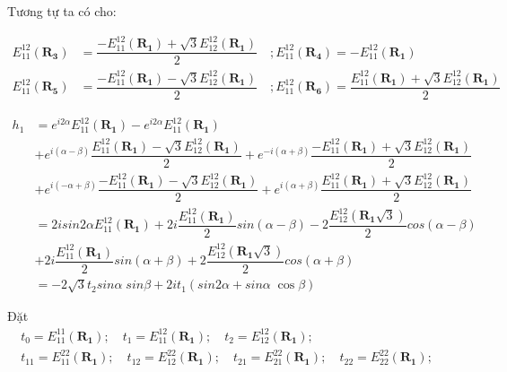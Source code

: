 \documentclass{report}
\begin{document}
Tương tự ta có cho:

\begin{align*}
	E_{11}^{12}(\mathbf{R_3}) & =  \dfrac{ -E_{11}^{12}(\mathbf{R_1}) + \sqrt{3} E_{12}^{12}(\mathbf{R_1})}{2} \quad ;  E_{11}^{12}(\mathbf{R_4}) = - E_{11}^{12}(\mathbf{R_1})                                                 \\
	E_{11}^{12}(\mathbf{R_5}) & =  \dfrac{ -E_{11}^{12}(\mathbf{R_1}) - \sqrt{3} E_{12}^{12}(\mathbf{R_1})}{2} \quad ; E_{11}^{12}(\mathbf{R_6})  =  \dfrac{ E_{11}^{12}(\mathbf{R_1}) + \sqrt{3} E_{12}^{12}(\mathbf{R_1})}{2}
\end{align*}

\begin{align*}
	h_1 & = e^{i2\alpha} E_{11}^{12}(\mathbf{R_1}) - e^{i2\alpha} E_{11}^{12}(\mathbf{R_1})                                                                                                                     \\
	    & + e^{i(\alpha - \beta)}\dfrac{ E_{11}^{12}(\mathbf{R_1}) - \sqrt{3} E_{12}^{12}(\mathbf{R_1})}{2} + e^{-i(\alpha + \beta)}\dfrac{ -E_{11}^{12}(\mathbf{R_1}) + \sqrt{3} E_{12}^{12}(\mathbf{R_1})}{2} \\
	    & + e^{i(-\alpha + \beta)} \dfrac{ -E_{11}^{12}(\mathbf{R_1}) - \sqrt{3} E_{12}^{12}(\mathbf{R_1})}{2} + e^{i(\alpha+\beta)}\dfrac{ E_{11}^{12}(\mathbf{R_1}) + \sqrt{3} E_{12}^{12}(\mathbf{R_1})}{2}  \\
	    & = 2isin2\alpha E_{11}^{12}(\mathbf{R_1}) + 2i \dfrac{E_{11}^{12}(\mathbf{R_1})}{2} sin(\alpha-\beta) - 2\dfrac{E_{12}^{12}(\mathbf{R_1}\sqrt{3})}{2} cos(\alpha - \beta)                              \\
	    & +  2i \dfrac{E_{11}^{12}(\mathbf{R_1})}{2} sin(\alpha+\beta) + 2\dfrac{E_{12}^{12}(\mathbf{R_1}\sqrt{3})}{2} cos(\alpha + \beta)                                                                      \\
	    & = -2\sqrt{3} t_2 sin\alpha \; sin\beta + 2i t_1(sin2\alpha + sin\alpha\;\cos\beta)
\end{align*}

Đặt
\begin{align*}
	t_0 = E_{11}^{11}(\mathbf{R_1}); \quad
	t_1 = E_{11}^{12}(\mathbf{R_1}); \quad
	t_2 = E_{12}^{12}(\mathbf{R_1}); \quad \\
	t_{11} = E_{11}^{22}(\mathbf{R_1}); \quad
	t_{12} = E_{12}^{22}(\mathbf{R_1}); \quad
	t_{21} = E_{21}^{22}(\mathbf{R_1}); \quad
	t_{22} = E_{22}^{22}(\mathbf{R_1}); \quad
\end{align*}
\end{document}
